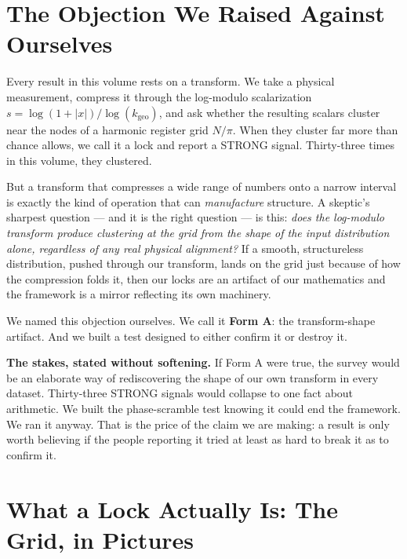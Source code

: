 \documentclass[11pt, letterpaper, openany]{book}
\begin{document}
\section{The Objection We Raised Against Ourselves}

\begin{oldworld}
Every result in this volume rests on a transform. We take a physical measurement,
compress it through the log-modulo scalarization $s = \log(1+|x|)/\log(k_{\text{geo}})$,
and ask whether the resulting scalars cluster near the nodes of a harmonic register
grid $N/\pi$. When they cluster far more than chance allows, we call it a lock and
report a STRONG signal. Thirty-three times in this volume, they clustered.
\end{oldworld}

But a transform that compresses a wide range of numbers onto a narrow interval is
exactly the kind of operation that can \emph{manufacture} structure. A skeptic's
sharpest question --- and it is the right question --- is this: \textit{does the
log-modulo transform produce clustering at the grid from the shape of the input
distribution alone, regardless of any real physical alignment?} If a smooth,
structureless distribution, pushed through our transform, lands on the grid just
because of how the compression folds it, then our locks are an artifact of our
mathematics and the framework is a mirror reflecting its own machinery.

We named this objection ourselves. We call it \textbf{Form A}: the transform-shape
artifact. And we built a test designed to either confirm it or destroy it.

\begin{warningbox}
\textbf{The stakes, stated without softening.} If Form A were true, the survey
would be an elaborate way of rediscovering the shape of our own transform in every
dataset. Thirty-three STRONG signals would collapse to one fact about arithmetic.
We built the phase-scramble test knowing it could end the framework. We ran it
anyway. That is the price of the claim we are making: a result is only worth
believing if the people reporting it tried at least as hard to break it as to
confirm it.
\end{warningbox}

\section{What a Lock Actually Is: The Grid, in Pictures}
\end{document}
